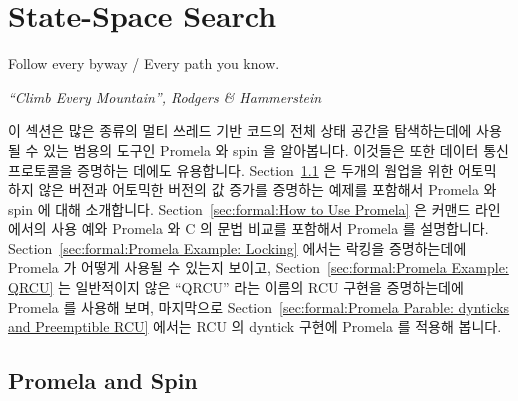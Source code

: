 
\section{State-Space Search}
\label{sec:formal:State-Space Search}
%
\epigraph{Follow every byway / Every path you know.}
	 {\emph{``Climb Every Mountain'', Rodgers \& Hammerstein}}

이 섹션은 많은 종류의 멀티 쓰레드 기반 코드의 전체 상태 공간을 탐색하는데에
사용될 수 있는 범용의 도구인 Promela 와 spin 을 알아봅니다.
이것들은 또한 데이터 통신 프로토콜을 증명하는 데에도 유용합니다.
Section~\ref{sec:formal:Promela and Spin}
은 두개의 웜업을 위한 어토믹 하지 않은 버전과 어토믹한 버전의 값 증가를
증명하는 예제를 포함해서 Promela 와 spin 에 대해 소개합니다.
Section~\ref{sec:formal:How to Use Promela}
은 커맨드 라인에서의 사용 예와 Promela 와 C 의 문법 비교를 포함해서 Promela 를
설명합니다.
Section~\ref{sec:formal:Promela Example: Locking}
에서는 락킹을 증명하는데에 Promela 가 어떻게 사용될 수 있는지 보이고,
Section~\ref{sec:formal:Promela Example: QRCU}
는 일반적이지 않은 ``QRCU'' 라는 이름의 RCU 구현을 증명하는데에 Promela 를
사용해 보며, 마지막으로
Section~\ref{sec:formal:Promela Parable: dynticks and Preemptible RCU}
에서는 RCU 의 dyntick 구현에 Promela 를 적용해 봅니다.
\iffalse

This section features the general-purpose Promela and Spin tools,
which may be used to carry out a full
state-space search of many types of multi-threaded code.
They are also quite useful for verifying data communication protocols.
Section~\ref{sec:formal:Promela and Spin}
introduces Promela and Spin, including a couple of warm-up exercises
verifying both non-atomic and atomic increment.
Section~\ref{sec:formal:How to Use Promela}
describes use of Promela, including example command lines and a
comparison of Promela syntax to that of C.
Section~\ref{sec:formal:Promela Example: Locking}
shows how Promela may be used to verify locking,
\ref{sec:formal:Promela Example: QRCU}
uses Promela to verify an unusual implementation of RCU named ``QRCU'',
and finally
Section~\ref{sec:formal:Promela Parable: dynticks and Preemptible RCU}
applies Promela to RCU's dyntick-idle implementation.
\fi

\subsection{Promela and Spin}
\label{sec:formal:Promela and Spin}

